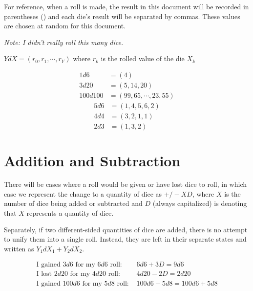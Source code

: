 \documentclass[../main.tex]{subfiles}
\begin{document}
    For reference, when a roll is made, the result in this document will be recorded in parentheses () and each die's result will be separated by commas. These values are chosen at random for this document.
    
    \emph{Note: I didn't really roll this many dice.}
    \begin{mdframed}[style=Arrata]
        \begin{center}
            $YdX = (r_{0},r_{1},\cdots,r_{Y})$ where $r_{k}$ is the rolled value of the die $X_{k}$
        \end{center}
        \noindent
        \begin{multicols}{2}
            \noindent 
            \begin{align*}
                1d6  & = (4)                            \\
                3d20 & = (5, 14, 20)                    \\
                100d100 & = (99, 65, \cdots, 23, 55) 
            \end{align*}
            \columnbreak
            \begin{align*}
                5d6 & = (1, 4, 5, 6, 2)                 \\
                4d4 & = (3, 2, 1, 1)                    \\
                2d3 & = (1, 3, 2)
            \end{align*}
        \end{multicols}
    \end{mdframed}

    \section{Addition and Subtraction}

    There will be cases where a roll would be given or have lost dice to roll, in which case we represent the change to a quantity of dice as $+/-XD$, where $X$ is the number of dice being added or subtracted and $D$ (always capitalized) is denoting that $X$ represents a quantity of dice.

    Separately, if two different-sided quantities of dice are added, there is no attempt to unify them into a single roll. Instead, they are left in their separate states and written as $Y_{1}dX_{1} + Y_{2}dX_{2}$.
    \\
    \begin{mdframed}[style=Arrata]
        \begin{align*}
            \text{I gained $3d6$ for my $6d6$ roll: } & 6d6 + 3D = 9d6          \\
            \text{I lost $2d20$ for my $4d20$ roll: } & 4d20 - 2D = 2d20        \\
            \text{I gained $100d6$ for my $5d8$ roll: } & 100d6 + 5d8 = 100d6 + 5d8    
        \end{align*}
    \end{mdframed}
\end{document}
